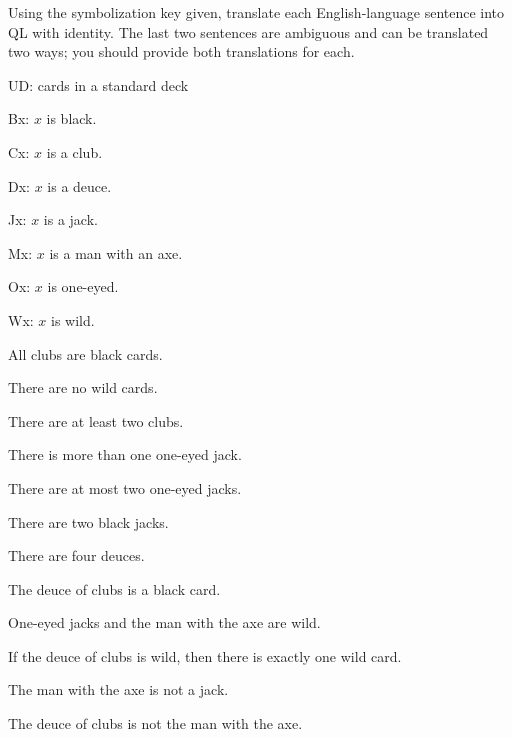 \solutions
\problempart
\label{pr.QLcards}
Using the symbolization key given, translate each English-language sentence into QL with identity. The last two sentences are ambiguous and can be translated two ways; you should provide both translations for each.
\begin{ekey}
\item[UD:] cards in a standard deck
\item[Bx:] $x$ is black.
\item[Cx:] $x$ is a club.
\item[Dx:] $x$ is a deuce.
\item[Jx:] $x$ is a jack.
\item[Mx:] $x$ is a man with an axe.
\item[Ox:] $x$ is one-eyed.
\item[Wx:] $x$ is wild.
\end{ekey}
\begin{earg}
\item All clubs are black cards.
\item There are no wild cards.
\item There are at least two clubs.
\item There is more than one one-eyed jack.
\item There are at most two one-eyed jacks.
\item There are two black jacks.
\item There are four deuces.
\item The deuce of clubs is a black card.
\item One-eyed jacks and the man with the axe are wild.
\item If the deuce of clubs is wild, then there is exactly one wild card.
\item The man with the axe is not a jack.
\item The deuce of clubs is not the man with the axe.
\end{earg}


